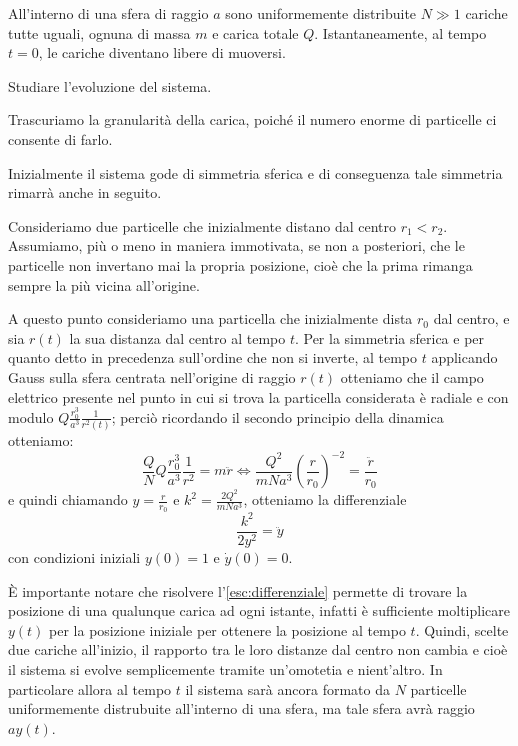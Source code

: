 \documentclass[../main.tex]{subfiles}
\begin{document}

\textex
All'interno di una sfera di raggio $a$ sono uniformemente distribuite $N \gg 1$ cariche tutte uguali, ognuna di massa $m$ e carica totale $Q$.
Istantaneamente, al tempo $t=0$, le cariche diventano libere di muoversi.

Studiare l'evoluzione del sistema.

\solution
Trascuriamo la granularità della carica, poiché il numero enorme di particelle ci consente di farlo.

Inizialmente il sistema gode di simmetria sferica e di conseguenza tale simmetria rimarrà anche in seguito.

Consideriamo due particelle che inizialmente distano dal centro $r_1<r_2$. Assumiamo, più o meno in maniera immotivata, se non a posteriori, che le particelle non invertano mai la propria posizione, cioè che la prima rimanga sempre la più vicina all'origine.

A questo punto consideriamo una particella che inizialmente dista $r_0$ dal centro, e sia $r(t)$ la sua distanza dal centro al tempo $t$.
Per la simmetria sferica e per quanto detto in precedenza sull'ordine che non si inverte, al tempo $t$ applicando Gauss sulla sfera centrata nell'origine di raggio $r(t)$ otteniamo che il campo elettrico presente nel punto in cui si trova la particella considerata è radiale e con modulo $Q\frac{r_0^3}{a^3}\frac 1{r^2(t)}$; perciò ricordando il secondo principio della dinamica otteniamo:
\begin{equation*}
	\frac QN Q\frac{r_0^3}{a^3}\frac 1{r^2} =m \ddot{r} \iff 
	\frac {Q^2}{mNa^3}\left(\frac{r}{r_0}\right)^{-2} =\frac{\ddot r}{r_0}
\end{equation*}
e quindi chiamando $y=\frac r{r_0}$ e $k^2=\frac {2Q^2}{mNa^3}$, otteniamo la differenziale
\begin{equation}\label{esc:differenziale}
	\frac {k^2}{2y^2}=\ddot y
\end{equation}
con condizioni iniziali $y(0)=1$ e $\dot y(0)=0$.

È importante notare che risolvere l'\cref{esc:differenziale} permette di trovare la posizione di una qualunque carica ad ogni istante, infatti è sufficiente moltiplicare $y(t)$ per la posizione iniziale per ottenere la posizione al tempo $t$.
Quindi, scelte due cariche all'inizio, il rapporto tra le loro distanze dal centro non cambia e cioè il sistema si evolve semplicemente tramite un'omotetia e nient'altro. In particolare allora al tempo $t$ il sistema sarà ancora formato da $N$ particelle uniformemente distrubuite all'interno di una sfera, ma tale sfera avrà raggio $ay(t)$.
\end{document}
